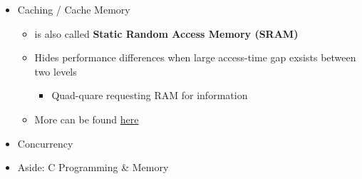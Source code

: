 \documentclass[12pt]{article}
\begin{document}
\begin{itemize}
    \item Caching / Cache Memory

    \begin{itemize}
        \item is also called \textbf{Static Random Access Memory (SRAM)}
        \item Hides performance differences when large access-time gap exsists
        between two levels
        \begin{itemize}
            \item Quad-quare requesting RAM for information


        \end{itemize}
        \item More can be found \href{https://www.youtube.com/watch?v=Zr8WKIOIKsk}{here}
    \end{itemize}
    \item Concurrency
    \item Aside: C Programming \& Memory
\end{itemize}
\end{document}
